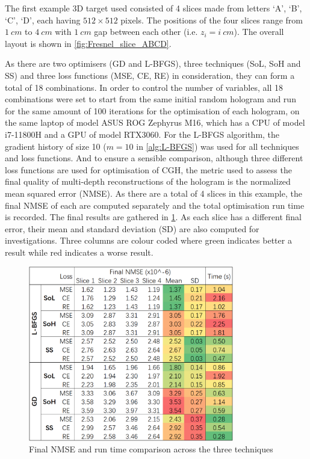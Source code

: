 The first example 3D target used consisted of 4 slices made from letters `A', `B', `C', `D', each having $512\times512$ pixels. The positions of the four slices range from $1\ cm$ to $4\ cm$ with $1\ cm$ gap between each other (i.e. $z_i=i\ cm$). The overall layout is shown in \cref{fig:Fresnel_slice_ABCD}.

As there are two optimisers (GD and L-BFGS), three techniques (SoL, SoH and SS) and three loss functions (MSE, CE, RE) in consideration, they can form a total of 18 combinations. In order to control the number of variables, all 18 combinations were set to start from the same initial random hologram and run for the same amount of 100 iterations for the optimisation of each hologram, on the same laptop of model ASUS ROG Zephyrus M16, which has a CPU of model i7-11800H and a GPU of model RTX3060. For the L-BFGS algorithm, the gradient history of size 10 ($m=10$ in \cref{alg:L-BFGS}) was used for all techniques and loss functions. And to ensure a sensible comparison, although three different loss functions are used for optimisation of CGH, the metric used to assess the final quality of multi-depth reconstructions of the hologram is the normalized mean squared error (NMSE). As there are a total of 4 slices in this example, the final NMSE of each are computed separately and the total optimisation run time is recorded. The final results are gathered in \cref{fig:Technique_Loss_comparison}. As each slice has a different final error, their mean and standard deviation (SD) are also computed for investigations. Three columns are colour coded where green indicates better a result while red indicates a worse result.

\begin{figure}[H]
	\centering
	\includegraphics[width=0.8\textwidth]{Technique_Loss_comparison}
	\caption{Final NMSE and run time comparison across the three techniques}
	\label{fig:Technique_Loss_comparison}
\end{figure}

